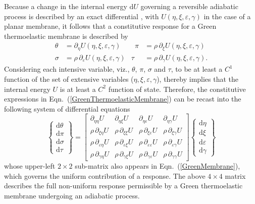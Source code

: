 Because a change in the internal energy $\mathrm{d} U$ governing a reversible adiabatic process is described by an exact differential \cite{Caratheodory09}, with $U( \eta, \xi, \varepsilon, \gamma )$ in the case of a planar membrane, it follows that a constitutive response for a Green thermo\-elastic membrane is described by
\begin{equation}
    \begin{aligned}
    \theta & = \partial_{\eta} U(\eta, \xi, \varepsilon, \gamma) &
    \phantom{\rho}
    \pi & = \rho \, \partial_{\xi} U(\eta, \xi, \varepsilon, \gamma)  \\
    \sigma & = \rho \, \partial_{\varepsilon} U(\eta, \xi, \varepsilon, \gamma) &
    \tau & = \rho \, \partial_{\gamma} U(\eta, \xi, \varepsilon, \gamma) .
    \end{aligned}
    \label{GreenThermoelasticMembrane}
\end{equation}
Considering each intensive variable, viz., $\theta$, $\pi$, $\sigma$ and $\tau$, to be at least a $C^1$ function of the set of extensive variables ($\eta , \xi , \varepsilon , \gamma$), thereby implies that the internal energy $U$ is at least a $C^2$ function of state.  Therefore, the constitutive expressions in Eqn.~(\ref{GreenThermoelasticMembrane}) can be recast into the following system of differential equations
\begin{equation}
\label{energies2D}
\left\{ \begin{matrix}
\mathrm{d} \theta \\ \mathrm{d} \pi \\
\mathrm{d} \sigma \\ \mathrm{d} \tau
\end{matrix} \right\} = \begin{bmatrix}
\partial_{\eta\eta} U & 
\partial_{\eta\xi} U & 
\partial_{\eta\varepsilon} U & 
\partial_{\eta\gamma} U \\ 
\rho \, \partial_{\xi\eta} U & 
\rho \, \partial_{\xi\xi} U & 
\rho \, \partial_{\xi\varepsilon} U &
\rho \, \partial_{\xi\gamma} U \\
\rho \, \partial_{\varepsilon\eta} U & 
\rho \, \partial_{\varepsilon\xi} U & 
\rho \, \partial_{\varepsilon\varepsilon} U & 
\rho \, \partial_{\varepsilon\gamma} U \\
\rho \, \partial_{\gamma\eta} U & 
\rho \, \partial_{\gamma\xi} U & 
\rho \, \partial_{\gamma\varepsilon} U & 
\rho \, \partial_{\gamma\gamma} U 
\end{bmatrix} 
\left\{ \begin{matrix}
\mathrm{d}\eta \\ \mathrm{d} \xi \\
\mathrm{d} \varepsilon \\ \mathrm{d} \gamma
\end{matrix} \right\}  
\end{equation}
whose upper-left $2\times 2$ sub-matrix also appears in Eqn.~(\ref{GreenMembrane}), which governs the uniform contribution of a response.  The above $4 \times 4$ matrix describes the full non-uniform response permissible by a Green thermo\-elastic membrane undergoing an adiabatic process.


